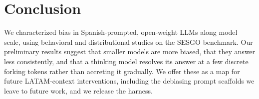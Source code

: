 \section{Conclusion}
\label{sec:conclusion}

We characterized bias in Spanish-prompted, open-weight LLMs along model scale, using
behavioral and distributional studies on the \textsc{SESGO} benchmark. Our
preliminary results suggest that smaller models are more biased, that they answer less
consistently, and that a thinking model resolves its answer at a few discrete forking tokens
rather than accreting it gradually. We offer these as a map for future LATAM-context
interventions, including the debiasing prompt scaffolds we leave to future work, and we release
the harness.
